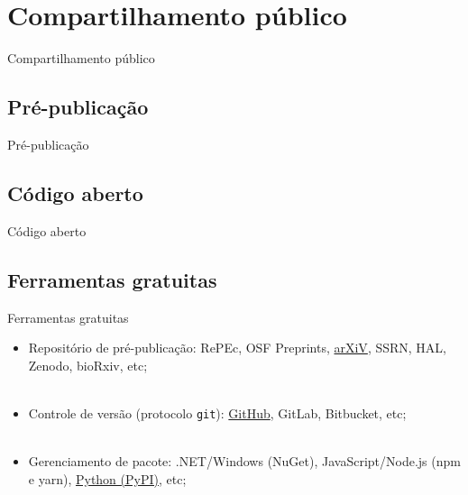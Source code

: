 \section{Compartilhamento público}
\label{s.public_sharing}

\begin{frame}{Compartilhamento público}
\end{frame}

\subsection{Pré-publicação}
\label{ss.research}

\begin{frame}{Pré-publicação}
\end{frame}

\subsection{Código aberto}
\label{ss.integrity}

\begin{frame}{Código aberto}
\end{frame}

\subsection{Ferramentas gratuitas}
\label{ss.free_tools}


\begin{frame}{Ferramentas gratuitas}
	\justify 
	\begin{itemize}
		\item<1> Repositório de pré-publicação: RePEc, OSF Preprints, \underline{arXiV}, SSRN, HAL, Zenodo, bioRxiv, etc;
		\\~\\
		\item<2> Controle de versão (protocolo \texttt{git}): \underline{GitHub}, GitLab, Bitbucket, etc;
		\\~\\
		\item<3> Gerenciamento de pacote: .NET/Windows (NuGet), JavaScript/Node.js (npm e yarn), \underline{Python (PyPI)}, etc;
	\end{itemize}
\end{frame}
